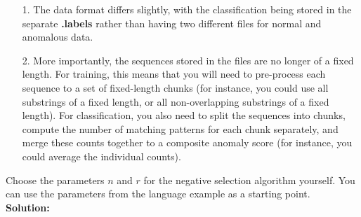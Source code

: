 \documentclass[a4paper]{article}
\begin{document}
\begin{enumerate}
	\begin{enumerate}
		\item[1.] The data format differs slightly, with the classification being stored in the separate \textbf{.labels} rather than having two different files for normal and anomalous data.	
		\item[2.] More importantly, the sequences stored in the files are no longer of a fixed length. For training, this means that you will need to pre-process each sequence to a set of fixed-length chunks (for instance, you could use all substrings of a fixed length, or all non-overlapping substrings of a fixed length). For classification, you also need to split the sequences into chunks, compute the number of matching patterns for each chunk separately, and merge these counts together to a composite anomaly score (for instance, you could average the individual counts).
	\end{enumerate}		

Choose the parameters $n$ and $r$ for the negative selection algorithm yourself. You can use the parameters from the language example as a starting point.\\
\textbf{Solution:}\\

\end{enumerate}
\end{document}
